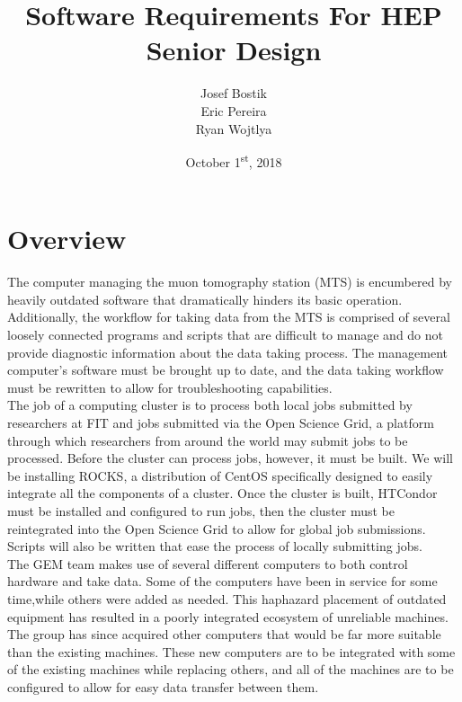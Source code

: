 \documentclass[12pt]{article}
\newcommand\tab[1][1cm]{\hspace*{#1}}
\begin{document}
\begin{titlepage}
	

\author{Josef Bostik\\
	Eric Pereira\\
	Ryan Wojtlya\\}
\date{October 1\textsuperscript{st}, 2018}
\title{Software Requirements For HEP Senior Design}
\maketitle
\end{titlepage}
\tableofcontents
\newpage
{}
\section*{Overview}
%
\tab The computer managing the muon tomography station (MTS) is encumbered by heavily outdated software that dramatically hinders its basic operation. Additionally, the workflow for taking data from the MTS is comprised of several loosely connected programs and scripts that are difficult to manage and do not provide diagnostic information about the data taking process. The management computer’s software must be brought up to date, and the data taking workflow must be rewritten to allow for troubleshooting capabilities. \\
\tab The job of a computing cluster is to process both local jobs submitted by researchers at FIT and jobs submitted via the Open Science Grid, a platform through which researchers from around the world may submit jobs to be processed. Before the cluster can process jobs, however, it must be built. We will be installing ROCKS, a distribution of CentOS specifically designed to easily integrate all the components of a cluster. Once the cluster is built, HTCondor must be installed and configured to run jobs, then the cluster must be reintegrated into the Open Science Grid to allow for global job submissions. Scripts will also be written that ease the process of locally submitting jobs. \\
\tab The GEM team makes use of several different computers to both control hardware and take data. Some of the computers have been in service for some time,while others were added as needed. This haphazard placement of outdated equipment has resulted in a poorly integrated ecosystem of unreliable machines. The group has since acquired other computers that would be far more suitable than the existing machines. These new computers are to be integrated with some of the existing machines while replacing others, and all of the machines are to be configured to allow for easy data transfer between them.\\
\end{document}
